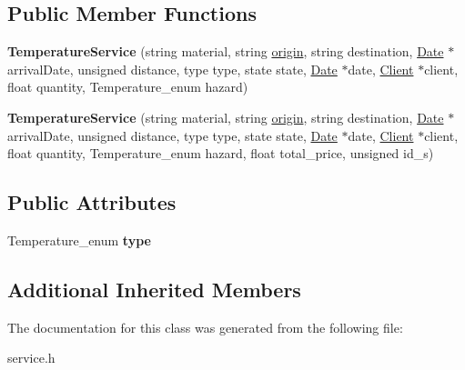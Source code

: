\subsection*{Public Member Functions}
\begin{DoxyCompactItemize}
\item 
\mbox{\label{class_temperature_service_a94888d7ca82463249929415a135f1264}} 
{\bfseries Temperature\+Service} (string material, string \hyperlink{class_service_a0e23ac4930720ab597a5c584703151f9}{origin}, string destination, \hyperlink{class_date}{Date} $\ast$arrival\+Date, unsigned distance, type type, state state, \hyperlink{class_date}{Date} $\ast$date, \hyperlink{class_client}{Client} $\ast$client, float quantity, Temperature\+\_\+enum hazard)
\item 
\mbox{\label{class_temperature_service_a980fd4745f1dc221fee79bff5f126ad5}} 
{\bfseries Temperature\+Service} (string material, string \hyperlink{class_service_a0e23ac4930720ab597a5c584703151f9}{origin}, string destination, \hyperlink{class_date}{Date} $\ast$arrival\+Date, unsigned distance, type type, state state, \hyperlink{class_date}{Date} $\ast$date, \hyperlink{class_client}{Client} $\ast$client, float quantity, Temperature\+\_\+enum hazard, float total\+\_\+price, unsigned id\+\_\+s)
\end{DoxyCompactItemize}
\subsection*{Public Attributes}
\begin{DoxyCompactItemize}
\item 
\mbox{\label{class_temperature_service_a1c6c01171d9ad6e56012440fb85a17bd}} 
Temperature\+\_\+enum {\bfseries type}
\end{DoxyCompactItemize}
\subsection*{Additional Inherited Members}


The documentation for this class was generated from the following file\+:\begin{DoxyCompactItemize}
\item 
service.\+h\end{DoxyCompactItemize}
